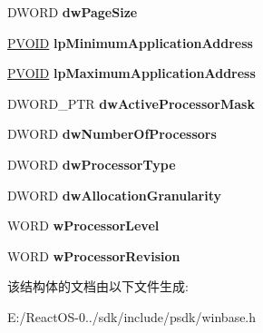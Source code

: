 \begin{DoxyCompactItemize}
\begin{tabbing}
\end{tabbing}\item 
\mbox{\label{struct___s_y_s_t_e_m___i_n_f_o_a1a885b1c7bd691985f8c5d784de0f410}} 
D\+W\+O\+RD {\bfseries dw\+Page\+Size}
\item 
\mbox{\label{struct___s_y_s_t_e_m___i_n_f_o_aa3f054185ba94854ee406678ca9617c3}} 
\hyperlink{interfacevoid}{P\+V\+O\+ID} {\bfseries lp\+Minimum\+Application\+Address}
\item 
\mbox{\label{struct___s_y_s_t_e_m___i_n_f_o_afccb3f660b1e21d18db0f3f582e95826}} 
\hyperlink{interfacevoid}{P\+V\+O\+ID} {\bfseries lp\+Maximum\+Application\+Address}
\item 
\mbox{\label{struct___s_y_s_t_e_m___i_n_f_o_a271efc0c76330a2a16999a02d6493849}} 
D\+W\+O\+R\+D\+\_\+\+P\+TR {\bfseries dw\+Active\+Processor\+Mask}
\item 
\mbox{\label{struct___s_y_s_t_e_m___i_n_f_o_a5787467fa3906e139b04ab4c59044d78}} 
D\+W\+O\+RD {\bfseries dw\+Number\+Of\+Processors}
\item 
\mbox{\label{struct___s_y_s_t_e_m___i_n_f_o_a86449a7e6bffddcf2522dae72c586b87}} 
D\+W\+O\+RD {\bfseries dw\+Processor\+Type}
\item 
\mbox{\label{struct___s_y_s_t_e_m___i_n_f_o_a47d69769b5b19488a26eb359990fe08f}} 
D\+W\+O\+RD {\bfseries dw\+Allocation\+Granularity}
\item 
\mbox{\label{struct___s_y_s_t_e_m___i_n_f_o_a59fa0c48ba6851fde2c57ba30c671ede}} 
W\+O\+RD {\bfseries w\+Processor\+Level}
\item 
\mbox{\label{struct___s_y_s_t_e_m___i_n_f_o_aa0f30439fcc20c520a5918df0a6098a9}} 
W\+O\+RD {\bfseries w\+Processor\+Revision}
\end{DoxyCompactItemize}


该结构体的文档由以下文件生成\+:\begin{DoxyCompactItemize}
\item 
E\+:/\+React\+O\+S-\/0../sdk/include/psdk/winbase.\+h\end{DoxyCompactItemize}
